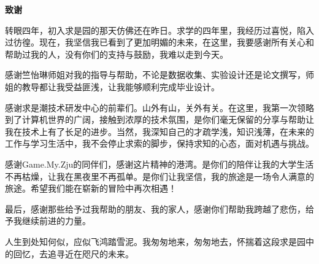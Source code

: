 \cleardoublepage{}
\begin{center}
    \bfseries {} 致谢
\end{center}

\par 转眼四年，初入求是园的那天仿佛还在昨日。求学的四年里，我经历过喜悦，陷入过彷徨。现在，我坚信我已看到了更加明媚的未来，在这里，我要感谢所有关心和帮助过我的人，没有你们的支持与鼓励，我难以走到今天。

\par 感谢竺怡琳师姐对我的指导与帮助，不论是数据收集、实验设计还是论文撰写，师姐的教导都让我受益匪浅，让我能够顺利完成毕业设计。

\par 感谢求是潮技术研发中心的前辈们。山外有山，关外有关。在这里，我第一次领略到了计算机世界的广阔，接触到浓厚的技术氛围，是你们毫无保留的分享与帮助让我在技术上有了长足的进步。当然，我深知自己的才疏学浅，知识浅薄，在未来的工作与学习生活中，我不会停止求索的脚步，保持求知的心态，面对机遇与挑战。

\par 感谢Game.My.Zju的同伴们，感谢这片精神的港湾。是你们的陪伴让我的大学生活不再枯燥，让我在黑夜里不再孤单。是你们让我坚信，我的旅途是一场令人满意的旅途。希望我们能在崭新的冒险中再次相遇！

\par 最后，感谢那些给予过我帮助的朋友、我的家人，感谢你们帮助我跨越了悲伤，给予我继续前进的力量。

\par 人生到处知何似，应似飞鸿踏雪泥。我匆匆地来，匆匆地去，怀揣着这段求是园中的回忆，去追寻近在咫尺的未来。